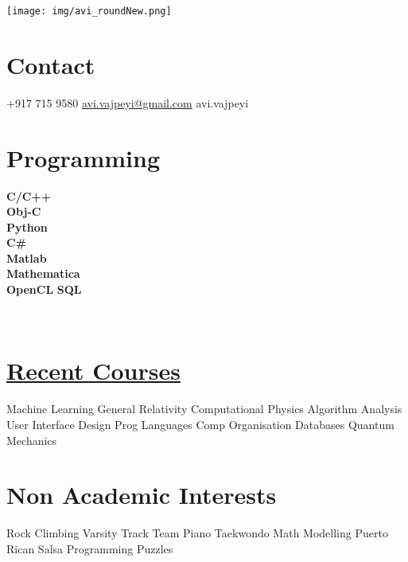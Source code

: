 \documentclass[]{friggeri-cv}
\def\faSkype{\FA\symbol{"F17E}}
\def\faCellphone{\FA\symbol{"F095}}
\def\faEmail{\FA\symbol{"F2B7}}
\begin{document}


\begin{aside}
  \texttt{[image: img/avi\_roundNew.png]}
  \section{Contact}
    +917 715 9580
    {\faEmail{}}\href{mailto:avi.vajpeyi@gmail.com}{{avi.vajpeyi@gmail.com}}
   {\color{SkypeBlue}\faSkype}   avi.vajpeyi
    ~
    ~
  \section{Programming}
    \textbf{C/C++\\}%
    \textbf{Obj-C\\}%
    \textbf{Python\\}%
    \textbf{C\#\\}%
    \textbf{Matlab\\}%
    \textbf{Mathematica\\}%
    \textbf{OpenCL}
    \textbf{SQL\\}

    ~
    ~
    \section{\href{https://github.com/avivajpeyi/Work-Files/blob/master/Avi_UnofficialTranscript_120916.pdf}{Recent Courses}}
    Machine Learning
    General Relativity
    Computational Physics
    Algorithm Analysis
    User Interface Design
    Prog Languages
    Comp Organisation
    Databases
    Quantum Mechanics
~
    ~
  \section{Non Academic Interests}
    Rock Climbing
    Varsity Track Team
    Piano
    Taekwondo
    Math Modelling
    Puerto Rican Salsa
    Programming Puzzles
    ~
    ~
     ~
     ~
     ~

\end{aside}
\end{document}
